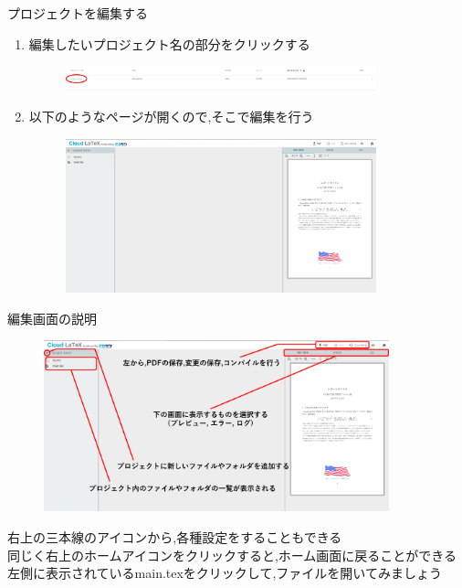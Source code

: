 \documentclass[dvipdfmx]{beamer}
\begin{document}
  \begin{frame}{プロジェクトを編集する}
    \begin{enumerate}
      \item {\scriptsize 編集したいプロジェクト名の部分をクリックする}
            \begin{figure}[h]
              \centering
              \includegraphics[width=9cm]{images/EditingProject1.png}
            \end{figure}
      \item {\scriptsize 以下のようなページが開くので,そこで編集を行う}
            \begin{figure}[h]
              \centering
              \includegraphics[width=9cm]{images/EditingProject2.png}
            \end{figure}
    \end{enumerate}
  \end{frame}
  \begin{frame}{編集画面の説明}
    \begin{figure}[h]
      \centering
      \includegraphics[width=10cm]{images/IntroductionOfEditing.png}
    \end{figure}
    {\scriptsize *右上の三本線のアイコンから,各種設定をすることもできる}\\
    {\scriptsize *同じく右上のホームアイコンをクリックすると,ホーム画面に戻ることができる}\\
    {\scriptsize *左側に表示されているmain.texをクリックして,ファイルを開いてみましょう}
  \end{frame}
\end{document}

